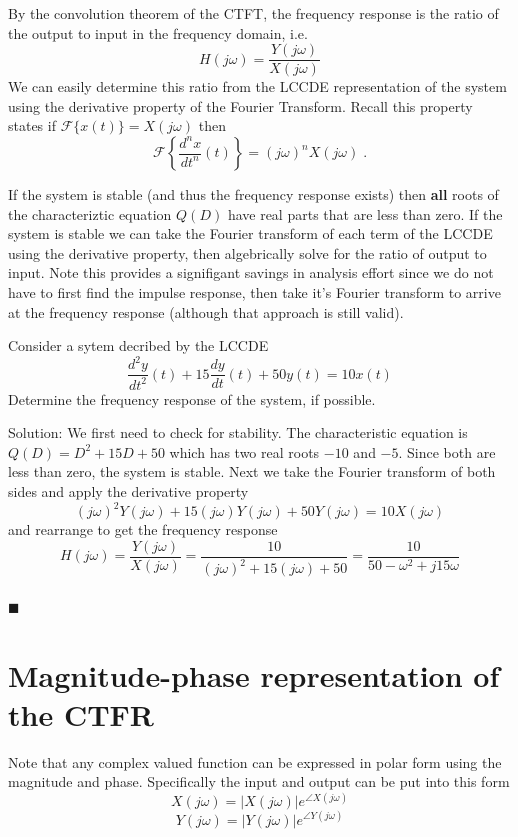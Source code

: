 By the convolution theorem of the CTFT, the frequency response is the ratio of the output to input in the frequency domain, i.e.
\[
H(j\omega) = \frac{Y(j\omega)}{X(j\omega)}
\]
We can easily determine this ratio from the LCCDE representation of the system using the derivative property of the Fourier Transform. Recall this property states if $\mathcal{F}\{x(t)\} = X(j\omega)$ then
\[
\mathcal{F}\left\{\frac{d^n x}{dt^n}(t) \right\} = (j\omega)^n  X(j\omega) \; .
\]

If the system is stable (and thus the frequency response exists) then \textbf{all} roots of the characteriztic equation $Q(D)$ have real parts that are less than zero. If the system is stable we can take the Fourier transform of each term of the LCCDE using the derivative property, then algebrically solve for the ratio of output to input. Note this provides a signifigant savings in analysis effort since we do not have to first find the impulse response, then take it's Fourier transform to arrive at the frequency response (although that approach is still valid).

\begin{example} Consider a sytem decribed by the LCCDE
  \[
\frac{d^2y}{dt^2}(t) + 15\frac{dy}{dt}(t) + 50y(t) = 10x(t) 
  \]
  Determine the frequency response of the system, if possible.

  Solution: We first need to check for stability. The characteristic equation is $Q(D) = D^2 + 15D + 50$ which has two real roots $-10$ and $-5$. Since both are less than zero, the system is stable. Next we take the Fourier transform of both sides and apply the derivative property
  \[
  (j\omega)^2Y(j\omega) + 15(j\omega) Y(j\omega) + 50Y(j\omega) = 10X(j\omega)
  \]
  and rearrange to get the frequency response
  \[
  H(j\omega) = \frac{Y(j\omega)}{X(j\omega)} = \frac{10}{(j\omega)^2 + 15(j\omega) + 50} = \frac{10}{50-\omega^2 + j15\omega}
  \]\\
  $\blacksquare$
\end{example}

\section{Magnitude-phase representation of the CTFR}

Note that any complex valued function can be expressed in polar form using the magnitude and phase. Specifically the input and output can be put into this form
\[
X(j\omega) = |X(j\omega)|e^{\angle X(j\omega)}
\]
\[
Y(j\omega) = |Y(j\omega)|e^{\angle Y(j\omega)}
\]

